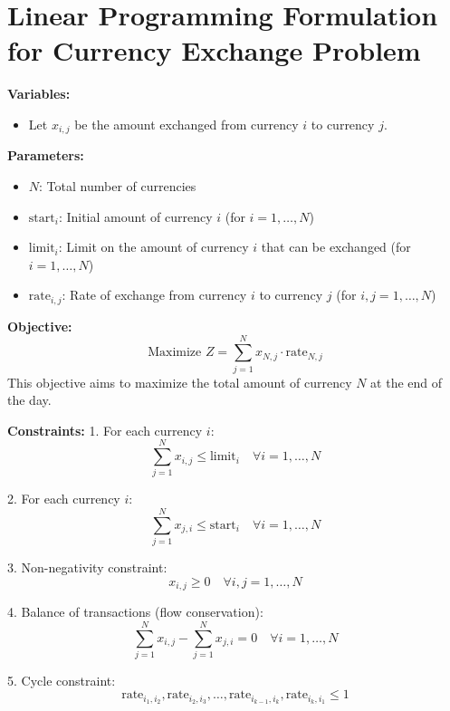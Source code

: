 \documentclass{article}
\begin{document}
\section*{Linear Programming Formulation for Currency Exchange Problem}

\textbf{Variables:}
\begin{itemize}
    \item Let \( x_{i,j} \) be the amount exchanged from currency \( i \) to currency \( j \).
\end{itemize}

\textbf{Parameters:}
\begin{itemize}
    \item \( N \): Total number of currencies
    \item \( \text{start}_i \): Initial amount of currency \( i \) (for \( i = 1, \ldots, N \))
    \item \( \text{limit}_i \): Limit on the amount of currency \( i \) that can be exchanged (for \( i = 1, \ldots, N \))
    \item \( \text{rate}_{i,j} \): Rate of exchange from currency \( i \) to currency \( j \) (for \( i, j = 1, \ldots, N \))
\end{itemize}

\textbf{Objective:}
\[
\text{Maximize } Z = \sum_{j=1}^{N} x_{N,j} \cdot \text{rate}_{N,j}
\]
This objective aims to maximize the total amount of currency \( N \) at the end of the day.

\textbf{Constraints:}
1. For each currency \( i \):
\[
\sum_{j=1}^{N} x_{i,j} \leq \text{limit}_i \quad \forall i = 1, \ldots, N
\]

2. For each currency \( i \):
\[
\sum_{j=1}^{N} x_{j,i} \leq \text{start}_i \quad \forall i = 1, \ldots, N
\]

3. Non-negativity constraint:
\[
x_{i,j} \geq 0 \quad \forall i,j = 1, \ldots, N
\]

4. Balance of transactions (flow conservation):
\[
\sum_{j=1}^{N} x_{i,j} - \sum_{j=1}^{N} x_{j,i} = 0 \quad \forall i = 1, \ldots, N
\]

5. Cycle constraint:
\[
\text{rate}_{i_1,i_2}, \text{rate}_{i_2,i_3}, \ldots, \text{rate}_{i_{k-1}, i_k}, \text{rate}_{i_k,i_1} \leq 1
\]
\end{document}
